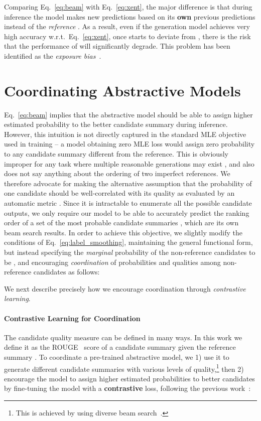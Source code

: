 \documentclass[11pt]{article}
\begin{document}
Comparing Eq.~\ref{eq:beam} with Eq.~\ref{eq:xent}, the major difference is that during inference the model makes new predictions based on its \textbf{own} previous predictions  instead of the \textit{reference} .
As a result, even if the generation model  achieves very high accuracy w.r.t.~Eq.~\ref{eq:xent}, once  starts to deviate from , there is the risk that the performance of  will significantly degrade.
This problem has been identified as the \textit{exposure bias}~\citep{10.5555/2969239.2969370}. 


\section{Coordinating Abstractive Models}

Eq.~\ref{eq:beam} implies that the abstractive model  should be able to assign higher estimated probability to the better candidate summary during inference.
However, this intuition is not directly captured in the standard MLE objective used in training -- a model obtaining zero MLE loss would assign zero probability to any candidate summary different from the reference.
This is obviously improper for any task where multiple reasonable generations may exist \citep{khayrallah-etal-2020-simulated}, and also does not say anything about the ordering of two imperfect references.
We therefore advocate for making the alternative assumption that the probability of one candidate should be well-correlated with its quality as evaluated by an automatic metric .
Since it is intractable to enumerate all the possible candidate outputs, we only require our model to be able to accurately predict the ranking order of a set of the most probable candidate summaries , which are its own beam search results.
In order to achieve this objective, we slightly modify the conditions of Eq.~\ref{eq:label_smoothing}, maintaining the general functional form, but instead specifying the \emph{marginal} probability of the non-reference candidates  to be , and encouraging \emph{coordination} of probabilities and qualities among non-reference candidates as follows:

We next describe precisely how we encourage coordination through \emph{contrastive learning}.
\paragraph{Contrastive Learning for Coordination}
The candidate quality measure  can be defined in many ways. 
In this work we define it as the ROUGE~\citep{lin-2004-rouge} score of a candidate summary  given the reference summary .
To coordinate a pre-trained abstractive model, we 1) use it to generate different candidate summaries with various levels of quality,\footnote{This is achieved by using diverse beam search~\citep{Vijayakumar_Cogswell_Selvaraju_Sun_Lee_Crandall_Batra_2018}.}
then 2) encourage the model to assign higher estimated probabilities to better candidates by fine-tuning the model with a \textbf{contrastive} loss, following the previous work~\citep{hopkins-may-2011-tuning, zhong-etal-2020-extractive}:
\end{document}
